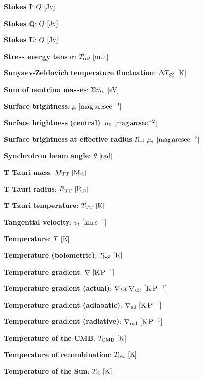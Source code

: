 \documentclass[a4paper,10pt]{article}
\begin{document}
{\noindent}\textbf{Stokes I}: $Q ~ [{\rm Jy}]$

{\noindent}\textbf{Stokes Q}: $Q ~ [{\rm Jy}]$

{\noindent}\textbf{Stokes U}: $Q ~ [{\rm Jy}]$

{\noindent}\textbf{Stress energy tensor}: $T_{\alpha\beta} ~ [{\rm unit}]$

{\noindent}\textbf{Sunyaev-Zeldovich temperature fluctuation}: $\Delta T_\mathrm{SZ} ~ [{\rm K}]$

{\noindent}\textbf{Sum of neutrino masses}: $\Sigma m_\nu ~ [{\rm eV}]$

{\noindent}\textbf{Surface brightness}: $\mu ~ [{\rm mag\,arcsec^{-2}}]$

{\noindent}\textbf{Surface brightness (central)}: $\mu_0 ~ [{\rm mag\,arcsec^{-2}}]$

{\noindent}\textbf{Surface brightness at effective radius $R_e$}: $\mu_e ~ [{\rm mag\,arcsec^{-2}}]$

{\noindent}\textbf{Synchrotron beam angle}: $\theta ~ [{\rm rad}]$

{\noindent}\textbf{T Tauri mass}: $M_{\rm TT} ~ [{\rm M_\odot}]$

{\noindent}\textbf{T Tauri radius}: $R_{\rm TT} ~ [{\rm R_\odot}]$

{\noindent}\textbf{T Tauri temperature}: $T_{\rm TT} ~ [{\rm K}]$

{\noindent}\textbf{Tangential velocity}: $v_t ~ [{\rm km\,s^{-1}}]$

{\noindent}\textbf{Temperature}: $T ~ [{\rm K}]$

{\noindent}\textbf{Temperature (bolometric)}: $T_{\rm bol} ~ [{\rm K}]$

{\noindent}\textbf{Temperature gradient}: $\nabla ~ [{\rm K\,P^{-1}}]$

{\noindent}\textbf{Temperature gradient (actual)}: $\nabla\,{\rm or}\,\nabla_{\rm act} ~ [{\rm K\,P^{-1}}]$

{\noindent}\textbf{Temperature gradient (adiabatic)}: $\nabla_{\rm ad} ~ [{\rm K\,P^{-1}}]$

{\noindent}\textbf{Temperature gradient (radiative)}: $\nabla_{\rm rad} ~ [{\rm K\,P^{-1}}]$

{\noindent}\textbf{Temperature of the CMB}: $T_{\rm CMB} ~ [{\rm K}]$

{\noindent}\textbf{Temperature of recombination}: $T_{\rm rec} ~ [{\rm K}]$

{\noindent}\textbf{Temperature of the Sun}: $T_\odot ~ [{\rm K}]$
\end{document}
